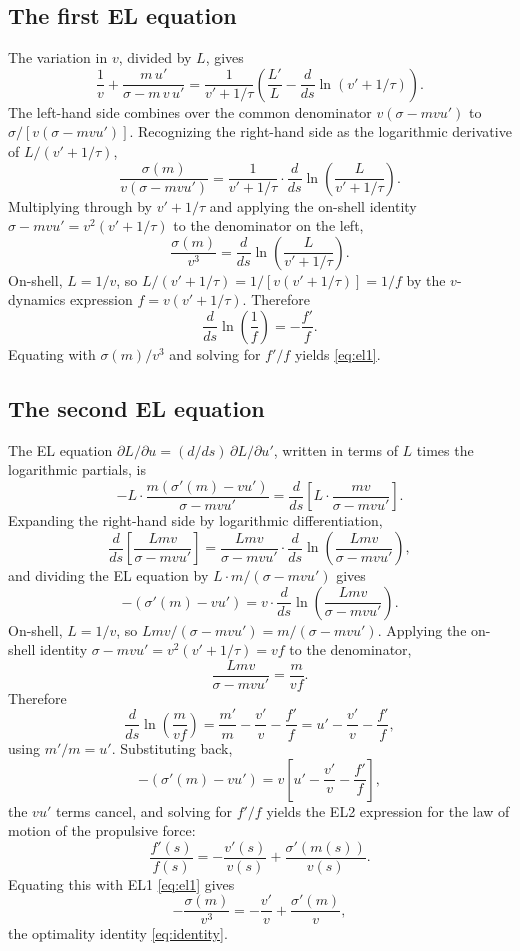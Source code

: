 \documentclass[11pt]{article}
\begin{document}
\subsection{The first EL equation}\label{app:el1}

The variation in $v$, divided by $L$, gives
\[
\frac{1}{v} + \frac{m\, u'}{\sigma - m\, v\, u'} = \frac{1}{v' + 1/\tau}\left(\frac{L'}{L} - \frac{d}{ds}\ln(v' + 1/\tau)\right).
\]
The left-hand side combines over the common denominator $v(\sigma - mvu')$ to $\sigma/[v(\sigma - mvu')]$. Recognizing the right-hand side as the logarithmic derivative of $L/(v' + 1/\tau)$,
\[
\frac{\sigma(m)}{v(\sigma - mvu')} = \frac{1}{v' + 1/\tau} \cdot \frac{d}{ds}\ln\left(\frac{L}{v' + 1/\tau}\right).
\]
Multiplying through by $v' + 1/\tau$ and applying the on-shell identity $\sigma - mvu' = v^2(v' + 1/\tau)$ to the denominator on the left,
\[
\frac{\sigma(m)}{v^3} = \frac{d}{ds}\ln\left(\frac{L}{v' + 1/\tau}\right).
\]
On-shell, $L = 1/v$, so $L/(v' + 1/\tau) = 1/[v(v' + 1/\tau)] = 1/f$ by the $v$-dynamics expression $f = v(v' + 1/\tau)$. Therefore
\[
\frac{d}{ds}\ln\left(\frac{1}{f}\right) = - \frac{f'}{f}.
\]
Equating with $\sigma(m)/v^3$ and solving for $f'/f$ yields \eqref{eq:el1}.

\subsection{The second EL equation}\label{app:el2}

The EL equation $\partial L/\partial u = (d/ds)\, \partial L/\partial u'$, written in terms of $L$ times the logarithmic partials, is
\[
-L \cdot \frac{m(\sigma'(m) - vu')}{\sigma - mvu'} = \frac{d}{ds}\left[L \cdot \frac{mv}{\sigma - mvu'}\right].
\]
Expanding the right-hand side by logarithmic differentiation,
\[
\frac{d}{ds}\left[\frac{Lmv}{\sigma - mvu'}\right] = \frac{Lmv}{\sigma - mvu'}\cdot\frac{d}{ds}\ln\!\left(\frac{Lmv}{\sigma - mvu'}\right),
\]
and dividing the EL equation by $L \cdot m/(\sigma - mvu')$ gives
\[
-(\sigma'(m) - vu') = v \cdot \frac{d}{ds}\ln\!\left(\frac{Lmv}{\sigma - mvu'}\right).
\]
On-shell, $L = 1/v$, so $Lmv/(\sigma - mvu') = m/(\sigma - mvu')$. Applying the on-shell identity $\sigma - mvu' = v^2(v' + 1/\tau) = vf$ to the denominator,
\[
\frac{Lmv}{\sigma - mvu'} = \frac{m}{vf}.
\]
Therefore
\[
\frac{d}{ds}\ln\!\left(\frac{m}{vf}\right) = \frac{m'}{m} - \frac{v'}{v} - \frac{f'}{f} = u' - \frac{v'}{v} - \frac{f'}{f},
\]
using $m'/m = u'$. Substituting back,
\[
-(\sigma'(m) - vu') = v\left[u' - \frac{v'}{v} - \frac{f'}{f}\right],
\]
the $vu'$ terms cancel, and solving for $f'/f$ yields the EL2 expression for the law of motion of the propulsive force:
\begin{equation}
\frac{f'(s)}{f(s)} = - \frac{v'(s)}{v(s)} + \frac{\sigma'(m(s))}{v(s)}.
\end{equation}
Equating this with EL1 \eqref{eq:el1} gives
\[
- \frac{\sigma(m)}{v^3} = - \frac{v'}{v} + \frac{\sigma'(m)}{v},
\]
the optimality identity \eqref{eq:identity}.
\end{document}
